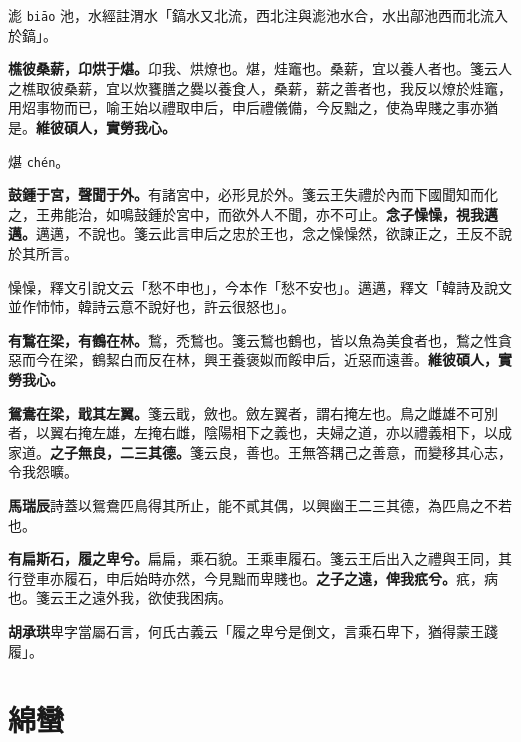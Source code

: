 \begin{quoting}滮 \texttt{biāo} 池，水經註渭水「鎬水又北流，西北注與滮池水合，水出鄗池西而北流入於鎬」。\end{quoting}

\textbf{樵彼桑薪，卬烘于煁。}{\footnotesize 卬我、烘燎也。煁，烓竈也。桑薪，宜以養人者也。箋云人之樵取彼桑薪，宜以炊饔膳之爨以養食人，桑薪，薪之善者也，我反以燎於烓竈，用炤事物而已，喻王始以禮取申后，申后禮儀備，今反黜之，使為卑賤之事亦猶是。}\textbf{維彼碩人，實勞我心。}

\begin{quoting}煁 \texttt{chén}。\end{quoting}

\textbf{鼓鍾于宮，聲聞于外。}{\footnotesize 有諸宮中，必形見於外。箋云王失禮於內而下國聞知而化之，王弗能治，如鳴鼓鍾於宮中，而欲外人不聞，亦不可止。}\textbf{念子懆懆，視我邁邁。}{\footnotesize 邁邁，不說也。箋云此言申后之忠於王也，念之懆懆然，欲諫正之，王反不說於其所言。}

\begin{quoting}懆懆，釋文引說文云「愁不申也」，今本作「愁不安也」。邁邁，釋文「韓詩及說文並作㤄㤄，韓詩云意不說好也，許云很怒也」。\end{quoting}

\textbf{有鶖在梁，有鶴在林。}{\footnotesize 鶖，禿鶖也。箋云鶖也鶴也，皆以魚為美食者也，鶖之性貪惡而今在梁，鶴絜白而反在林，興王養褒姒而餒申后，近惡而遠善。}\textbf{維彼碩人，實勞我心。}

\textbf{鴛鴦在梁，戢其左翼。}{\footnotesize 箋云戢，斂也。斂左翼者，謂右掩左也。鳥之雌雄不可別者，以翼右掩左雄，左掩右雌，陰陽相下之義也，夫婦之道，亦以禮義相下，以成家道。}\textbf{之子無良，二三其德。}{\footnotesize 箋云良，善也。王無答耦己之善意，而變移其心志，令我怨曠。}

\begin{quoting}\textbf{馬瑞辰}詩蓋以鴛鴦匹鳥得其所止，能不貳其偶，以興幽王二三其德，為匹鳥之不若也。\end{quoting}

\textbf{有扁斯石，履之卑兮。}{\footnotesize 扁扁，乘石貌。王乘車履石。箋云王后出入之禮與王同，其行登車亦履石，申后始時亦然，今見黜而卑賤也。}\textbf{之子之遠，俾我疧兮。}{\footnotesize 疧，病也。箋云王之遠外我，欲使我困病。}

\begin{quoting}\textbf{胡承珙}卑字當屬石言，何氏古義云「履之卑兮是倒文，言乘石卑下，猶得蒙王踐履」。\end{quoting}

\section{綿蠻}

